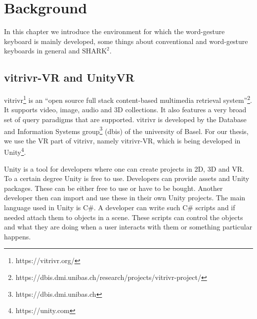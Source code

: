 \chapter{Background}

In this chapter we introduce the environment for which the word-gesture keyboard is mainly developed, some things about conventional and word-gesture keyboards in general and $\text{SHARK}^2$.

\section{vitrivr-VR and UnityVR}
vitrivr\footnote{https://vitrivr.org/} is an ``open source full stack content-based multimedia retrieval system''\footnote{https://dbis.dmi.unibas.ch/research/projects/vitrivr-project/}. It supports video, image, audio and 3D collections. It also features a very broad set of query paradigms that are supported. vitrivr is developed by the Database and Information Systems group\footnote{https://dbis.dmi.unibas.ch} (dbis) of the university of Basel. For our thesis, we use the VR part of vitrivr, namely vitrivr-VR, which is being developed in Unity\footnote{https://unity.com}.

Unity is a tool for developers where one can create projects in 2D, 3D and VR. To a certain degree Unity is free to use. Developers can provide assets and Unity packages. These can be either free to use or have to be bought. Another developer then can import and use these in their own Unity projects. The main language used in Unity is C\#. A developer can write such C\# scripts and if needed attach them to objects in a scene. These scripts can control the objects and what they are doing when a user interacts with them or something particular happens. 


